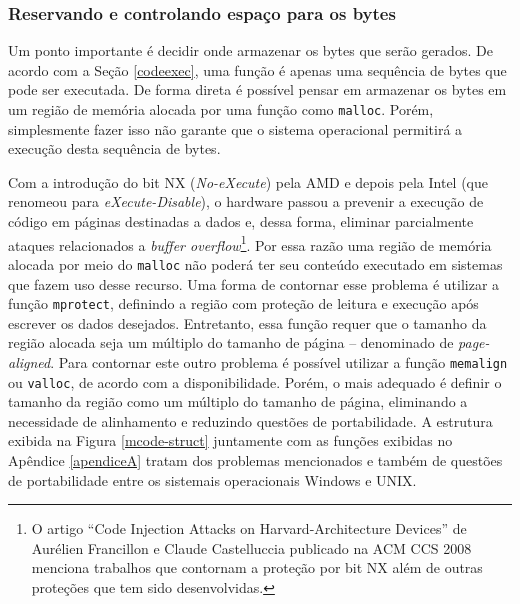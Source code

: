 
\subsubsection{Reservando e controlando espaço para os bytes}
Um ponto importante é decidir onde armazenar os bytes que serão
gerados. De acordo com a Seção \ref{codeexec}, uma função é apenas uma
sequência de bytes que pode ser executada. De forma direta é possível
pensar em armazenar os bytes em um região de memória alocada por
uma função como \verb!malloc!. Porém, simplesmente fazer isso não garante
que o sistema operacional permitirá a execução desta sequência de bytes.

Com a introdução do bit NX (\textit{No-eXecute}) pela AMD e depois
pela Intel (que renomeou para \textit{eXecute-Disable}), o hardware
passou a prevenir a execução de código em páginas destinadas a
dados \cite{intel_prog} e, dessa forma, eliminar
parcialmente ataques relacionados a \textit{buffer
  overflow}\footnote{O artigo ``Code Injection Attacks on
  Harvard-Architecture Devices'' de Aurélien Francillon e Claude
  Castelluccia publicado na ACM CCS 2008 menciona trabalhos que
  contornam a proteção por bit NX além de outras proteções que
  tem sido desenvolvidas.}.
Por essa razão uma região de
memória alocada por meio do \verb!malloc! não poderá ter seu conteúdo
executado em sistemas que fazem uso desse recurso. Uma forma de
contornar esse problema é utilizar a função \verb!mprotect!,
definindo a região com proteção de leitura e execução após escrever os dados
desejados. Entretanto, essa função requer que o tamanho da região
alocada seja um múltiplo do tamanho de página -- denominado de
\textit{page-aligned}. Para contornar este outro problema é possível
utilizar a função
\verb!memalign! ou \verb!valloc!, de acordo com a disponibilidade. Porém,
o mais adequado é definir o tamanho da região como um múltiplo do
tamanho de página, eliminando a necessidade de alinhamento e reduzindo
questões de portabilidade. %
A estrutura exibida na Figura \ref{mcode-struct}
juntamente com as funções%
 exibidas no Apêndice \ref{apendiceA}
tratam dos problemas mencionados %
 e também
de questões de portabilidade entre os sistemais operacionais Windows e UNIX.


